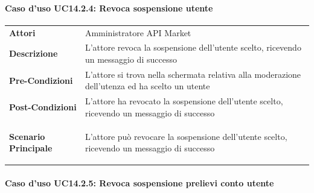 \paragraph{Caso d'uso UC14.2.4: Revoca sospensione utente}
\label{UC14_2_4}

\begin{minipage}{\linewidth}
	\begin{tabular}{ l | p{11cm}}
		\hline
		\rowcolor{Gray}
		\multicolumn{2}{c}{UC14.2.4 - Revoca sospensione utente} \\
		\hline
		\textbf{Attori} & Amministratore API Market \\
		\textbf{Descrizione} & L'attore revoca la sospensione dell'utente scelto, ricevendo un messaggio di successo \\
		\textbf{Pre-Condizioni} & L'attore si trova nella schermata relativa alla moderazione dell'utenza ed ha scelto un utente \\
		\textbf{Post-Condizioni} & L'attore ha revocato la sospensione dell'utente scelto, ricevendo un messaggio di successo \\
		\textbf{Scenario Principale} & 
		\begin{enumerate*}[label=(\arabic*.),itemjoin={\newline}]
			\item L'attore può revocare la sospensione dell'utente scelto, ricevendo un messaggio di successo
		\end{enumerate*}\\
	\end{tabular}
\end{minipage}

\paragraph{Caso d'uso UC14.2.5: Revoca sospensione prelievi conto utente}
\label{UC14_2_5}

